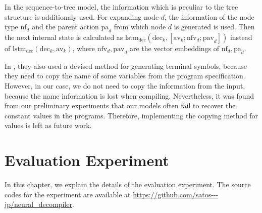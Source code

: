 \documentclass[senior,final,11pt]{iscs-thesis}
\begin{document}

In the sequence-to-tree model, the information which is peculiar to the tree structure is additionaly used.
For expanding node $d$, the information of the node type $ \mathrm{nf}_{d} $ and the parent action $\mathrm{pa}_{d}$ from which node $d$ is generated is used.
Then the next internal state is calculated as $ \mathrm{lstm}_{\mathrm{dec}}(\mathrm{dec}_{k},[\mathrm{av}_{k}; \mathrm{nfv}_{d}; \mathrm{pav}_{d}]) $ instead of $ \mathrm{lstm}_{\mathrm{dec}}(\mathrm{dec}_{k},\mathrm{av}_{k}) $, 
where $\mathrm{nfv}_{d},\mathrm{pav}_{d}$ are the vector embeddings of $\mathrm{nf}_{d},\mathrm{pa}_{d}$.

In \citet{Seq2Tree}, they also used a devised method for generating terminal symbols, because they need to copy the name of some variables from the program specification.
However, in our case, we do not need to copy the information from the input, because the name information is lost when compiling.
Nevertheless, it was found from our preliminary experiments that our models often fail to recover the constant values in the programs.
Therefore, implementing the copying method for values is left as future work.



\chapter{Evaluation Experiment}
In this chapter, we explain the details of the evaluation experiment.
The source codes for the experiment are available at \url{https://github.com/satos---jp/neural_decompiler}.  
\end{document}
